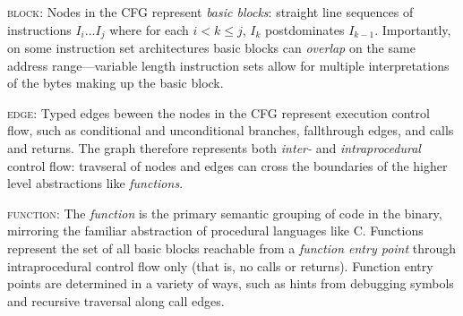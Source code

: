 \documentclass{article}
\begin{document}
%
\begin{itemize}[leftmargin=0pt,label=$\circ$]


{\item {\scshape block}: Nodes in the CFG represent \emph{basic blocks}:
straight line sequences of instructions $I_i \ldots I_j$ where for each $i < k
\le j$, $I_k$ postdominates $I_{k-1}$. Importantly, on some instruction set architectures basic blocks can \emph{overlap} on the same address range---variable length instruction sets allow for multiple interpretations of the bytes making up the basic block.
}

{\item {\scshape edge}: Typed edges beween the nodes in the CFG represent
execution control flow, such as conditional and unconditional branches,
fallthrough edges, and calls and returns. The graph therefore represents both
\emph{inter-} and \emph{intraprocedural} control flow: travseral of nodes and
edges can cross the boundaries of the higher level abstractions like
\emph{functions}.
}

{\item {\scshape function}: The \emph{function} is the primary semantic grouping of code in the binary, mirroring the familiar abstraction of procedural languages like C. Functions represent the set of all basic blocks reachable from a \emph{function entry point} through intraprocedural control flow only (that is, no calls or returns). Function entry points are determined in a variety of ways, such as hints from debugging symbols and recursive traversal along call edges.
}

\end{itemize}
\end{document}
